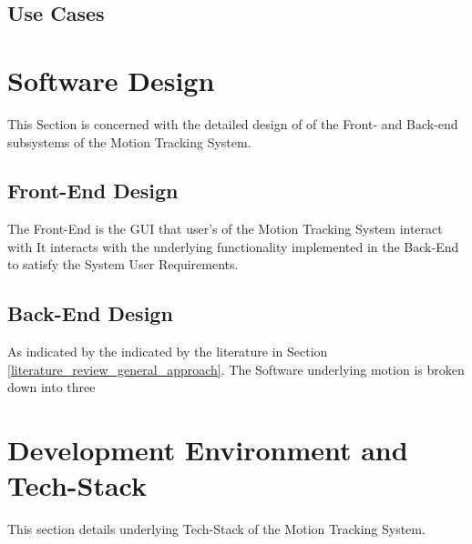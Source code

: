 \subsection{Use Cases}

\section{Software Design}
This Section is concerned with the detailed design of of the Front- and Back-end
subsystems of the Motion Tracking System.

\subsection{Front-End Design}
The Front-End is the GUI that user's of the Motion Tracking System interact with 
It interacts with the underlying functionality implemented in the Back-End to
satisfy the System User Requirements. 

\subsection{Back-End Design}
As indicated by the indicated by the literature in Section
\ref{literature_review_general_approach}. The Software underlying motion is broken down into three

\section{Development Environment and Tech-Stack}
This section details underlying Tech-Stack of the Motion Tracking System.



